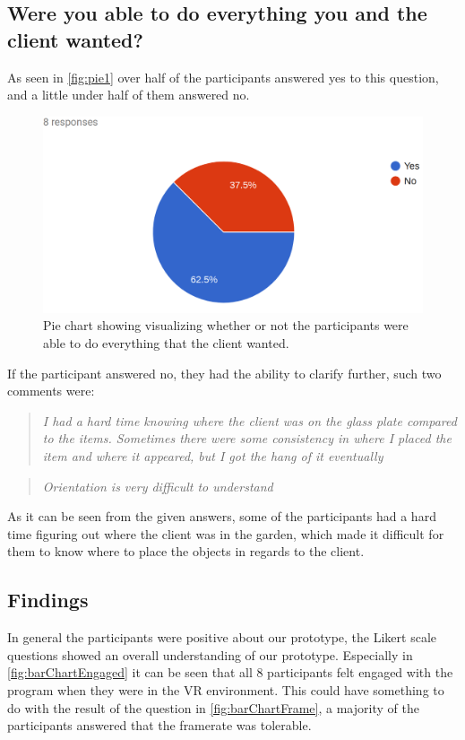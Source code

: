 \subsection*{Were you able to do everything you and the client wanted?}
As seen in \autoref{fig:pie1} over half of the participants answered yes to this question, and a little under half of them answered no.

\begin{figure}[H]
	\centering
	\includegraphics[width=0.8\linewidth]{figure/Evaluation/pie1.png}
	\caption{Pie chart showing visualizing whether or not the participants were able to do everything that the client wanted.}
	\label{fig:pie1}
\end{figure}

If the participant answered no, they had the ability to clarify further, such two comments were:\\

 \begin{quote}
 	
\textit{I had a hard time knowing where the client was on the glass plate compared to the items. Sometimes there were some consistency in where I placed the item and where it appeared, but I got the hang of it eventually}\\
  \end{quote}
  
  \begin{quote}
  \textit{Orientation is very difficult to understand}\\
  \end{quote}	
 	 
 	As it can be seen from the given answers, some of the participants had a hard time figuring out where the client was in the garden, which made it difficult for them to know where to place the objects in regards to the client.


\subsection{Findings}
In general the participants were positive about our prototype, the Likert scale questions showed an overall understanding of our prototype.
Especially in \autoref{fig:barChartEngaged} it can be seen that all 8 participants felt engaged with the program when they were in the VR environment. This could have something to do with the result of the question in \autoref{fig:barChartFrame}, a majority of the participants answered that the framerate was tolerable.\\


